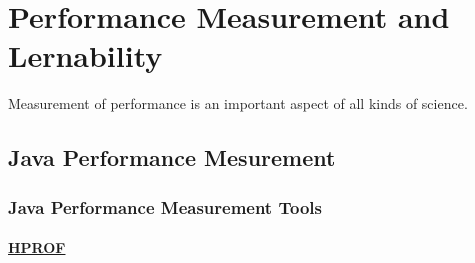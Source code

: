 \chapter{Performance Measurement and Lernability}
\label{chap:p_measurement}

 Measurement of performance is an important aspect of all kinds of science. 


\section{Java Performance Mesurement}
\label{perf_measure}


\subsection{Java Performance Measurement Tools}



\subsubsection{\href{https://profiler.netbeans.org/}{HPROF}}


